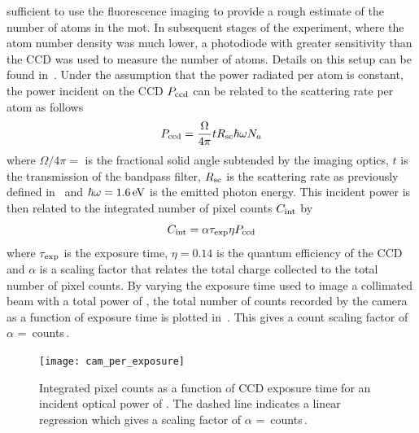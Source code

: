 sufficient to use the fluorescence imaging to provide a rough estimate of the
number of atoms in the \ac{mot}. In subsequent stages of the experiment, where
the atom number density was much lower, a photodiode with greater sensitivity
than the CCD was used to measure the number of atoms. Details on this setup can
be found in~. Under the assumption that the
power radiated per atom is constant, the power incident on the CCD
\(P_\textnormal{ccd}\) can be related to the scattering rate per atom as follows
\begin{equation}
	P_\textnormal{ccd} = \frac{\Omega}{4\pi} t R_\textnormal{sc}  \hbar \omega N_a
\end{equation}
where $\Omega/4\pi = $ is the fractional solid angle subtended by
the imaging optics, \(t\) is the transmission of the bandpass filter,
\(R_\textnormal{sc}\) is the scattering rate as previously defined
in~ and \(\hbar \omega =
\sivalue{1.6}{\electronvolt}\) is the emitted photon energy. This incident power
is then related to the integrated number of pixel counts \(C_\textnormal{int}\)
by
\begin{equation}
	C_\textnormal{int} = \alpha \tau_\textnormal{exp} \eta P_\textnormal{ccd}
\end{equation}
where \(\tau_\textnormal{exp}\) is the exposure time, \(\eta = 0.14\) is the
quantum efficiency of the CCD and \(\alpha\) is a scaling factor that relates
the total charge collected to the total number of pixel counts. By varying the
exposure time used to image a collimated beam with a total power of
, the total number of counts recorded by the camera
as a function of exposure time is plotted in~. This
gives a count scaling factor of \(\alpha\) =
\,counts\,\sivalue{}{\per\micro\second\per\micro\watt}.
\begin{figure}[!htbp]
	\centering
	\texttt{[image: cam\_per\_exposure]}
	\caption[Integrated pixel counts as a function of CCD exposure
		time.]{Integrated pixel counts as a function of CCD exposure time for an
		incident optical power of . The dashed line
		indicates a linear regression which gives a scaling factor of \(\alpha\)
		=
		\,counts\,\sivalue{}{\per\micro\second\per\micro\watt}.}
	\label{fig:camera_counts}
\end{figure}

